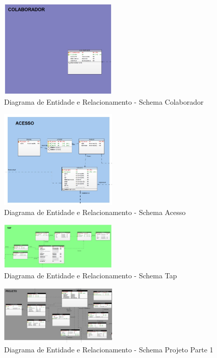 \documentclass{acm_proc_article-sp}
\begin{document}
\begin{figure}[h]
\centering %
\includegraphics[width=0.5\textwidth]{DER_colaborador.jpg} %
\caption{Diagrama de Entidade e Relacionamento - Schema Colaborador}
\end{figure}

\begin{figure}[h]
\centering %
\includegraphics[width=0.5\textwidth]{DER_acesso.jpg} %
\caption{Diagrama de Entidade e Relacionamento - Schema Acesso}
\end{figure} 

\begin{figure}[h]
\centering %
\includegraphics[width=0.5\textwidth]{DER_tap.jpg} %
\caption{Diagrama de Entidade e Relacionamento - Schema Tap}
\end{figure}

\begin{figure}[h]
\centering %
\includegraphics[width=0.5\textwidth]{DER_projeto_p1.jpg} %
\caption{Diagrama de Entidade e Relacionamento - Schema Projeto Parte 1}
\end{figure}
\end{document}
